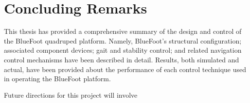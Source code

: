 \chapter{Concluding Remarks}

This thesis has provided a comprehensive summary of the design and control of the BlueFoot quadruped platform. Namely, BlueFoot's structural configuration; associated component devices; gait and stability control; and related navigation control mechanisms have been described in detail. Results, both simulated and actual, have been provided about the performance of each control technique used in operating the BlueFoot platform.

Future directions for this project will involve 